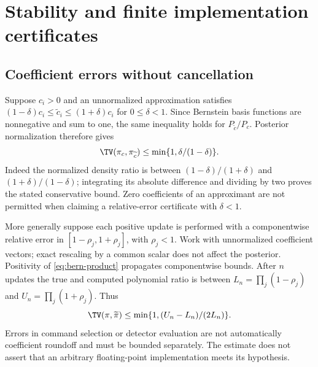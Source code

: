 \section{Stability and finite implementation certificates}\label{sec:stability}
\subsection{Coefficient errors without cancellation}
Suppose $c_i>0$ and an unnormalized approximation satisfies
$(1-\delta)c_i\le\widetilde c_i\le(1+\delta)c_i$ for $0\le\delta<1$.
Since Bernstein basis functions are nonnegative and sum to one, the same
inequality holds for $P_{\widetilde c}/P_c$. Posterior normalization therefore
gives
\begin{equation}
 \TV(\pi_c,\pi_{\widetilde c})\le
             \min\{1,\delta/(1-\delta)\}.
 \label{eq:posterior-error}
\end{equation}
Indeed the normalized density ratio is between
$(1-\delta)/(1+\delta)$ and $(1+\delta)/(1-\delta)$; integrating its
absolute difference and dividing by two proves the stated conservative
bound. Zero coefficients of an approximant are not permitted when claiming
a relative-error certificate with $\delta<1$.

More generally suppose each positive update is performed with a componentwise
relative error in $[1-\rho_j,1+\rho_j]$, with $\rho_j<1$. Work with
unnormalized coefficient vectors; exact rescaling by a common scalar does
not affect the posterior. Positivity of \eqref{eq:bern-product} propagates
componentwise bounds. After $n$ updates the true and computed polynomial
ratio is between $L_n=\prod_j(1-\rho_j)$ and
$U_n=\prod_j(1+\rho_j)$. Thus
\begin{equation}
 \TV(\pi,\widetilde\pi)\le
              \min\{1,(U_n-L_n)/(2L_n)\}.
 \label{eq:accumulated-error}
\end{equation}
Errors in command selection or detector evaluation are not automatically
coefficient roundoff and must be bounded separately. The estimate does not
assert that an arbitrary floating-point implementation meets its hypothesis.

